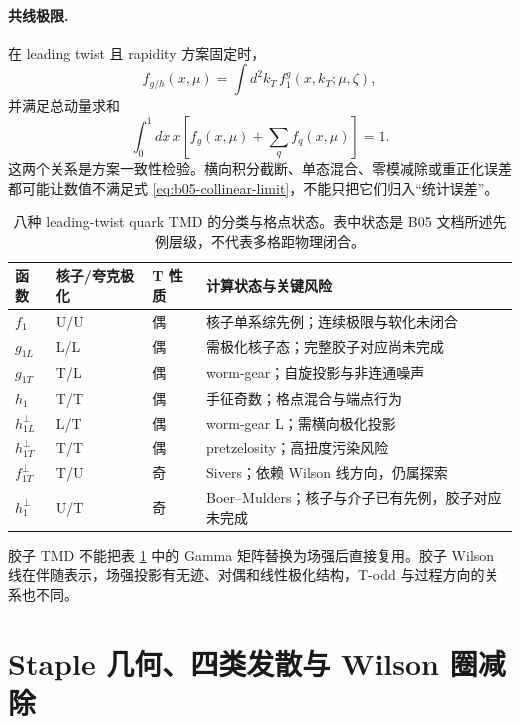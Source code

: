 \paragraph{共线极限.}
在 leading twist 且 rapidity 方案固定时，
\begin{equation}
  f_{g/h}(x,\mu)
  =\int d^2k_T\,f_1^g(x,k_T;\mu,\zeta),
  \label{eq:b05-collinear-limit}
  \end{equation}
并满足总动量求和
\begin{equation}
  \int_0^1dx\,x\left[f_g(x,\mu)+\sum_qf_q(x,\mu)\right]=1.
  \label{eq:b05-momentum-sum}
\end{equation}
这两个关系是方案一致性检验。横向积分截断、单态混合、零模减除或重正化误差都可能让数值不满足式 \eqref{eq:b05-collinear-limit}，不能只把它们归入“统计误差”。

\begin{table}[H]
  \centering
  \caption{八种 leading-twist quark TMD 的分类与格点状态。表中状态是 B05 文档所述先例层级，不代表多格距物理闭合。}
  \label{tab:b05-quark-tmd}
  \footnotesize
  \begin{tabularx}{\textwidth}{@{}p{}p{}p{}X@{}}
    \toprule
    函数 & 核子/夸克极化 & T 性质 & 计算状态与关键风险 \\
    \midrule
    \(f_1\) & U/U & 偶 & 核子单系综先例；连续极限与软化未闭合 \\
    \(g_{1L}\) & L/L & 偶 & 需极化核子态；完整胶子对应尚未完成 \\
    \(g_{1T}\) & T/L & 偶 & worm-gear；自旋投影与非连通噪声 \\
    \(h_1\) & T/T & 偶 & 手征奇数；格点混合与端点行为 \\
    \(h_{1L}^{\perp}\) & L/T & 偶 & worm-gear L；需横向极化投影 \\
    \(h_{1T}^{\perp}\) & T/T & 偶 & pretzelosity；高扭度污染风险 \\
    \(f_{1T}^{\perp}\) & T/U & 奇 & Sivers；依赖 Wilson 线方向，仍属探索 \\
    \(h_1^{\perp}\) & U/T & 奇 & Boer--Mulders；核子与介子已有先例，胶子对应未完成 \\
    \bottomrule
  \end{tabularx}
\end{table}

胶子 TMD 不能把表 \ref{tab:b05-quark-tmd} 中的 Gamma 矩阵替换为场强后直接复用。胶子 Wilson 线在伴随表示，场强投影有无迹、对偶和线性极化结构，T-odd 与过程方向的关系也不同。

\section{Staple 几何、四类发散与 Wilson 圈减除}

